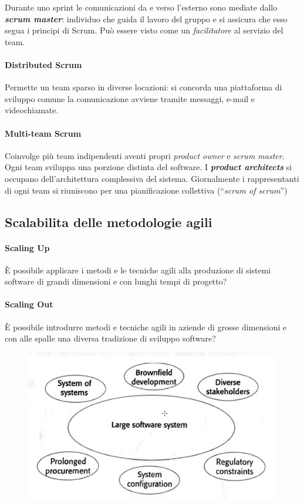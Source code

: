 Durante uno sprint le comunicazioni da e verso l'esterno sono mediate dallo \textbf{\textit{scrum master}}: individuo che guida il lavoro del gruppo e si assicura che esso segua i principi di Scrum. Può essere visto come un \textit{facilitatore} al servizio del team.

\paragraph{Distributed Scrum} Permette un team sparso in diverse locazioni: si concorda una piattaforma di sviluppo comune la comunicazione avviene tramite messaggi, e-mail e videochiamate.

\paragraph{Multi-team Scrum} Coinvolge più team indipendenti aventi propri \textit{product owner} e \textit{scrum master}. Ogni team sviluppa una porzione distinta del software. I \textbf{\textit{product architects}} si occupano dell'architettura complessiva del sistema. Giornalmente i rappresentanti di ogni team si riuniscono per una pianificazione collettiva (“\textit{scrum of scrum}”)

\subsection{Scalabilita delle metodologie agili}

\paragraph{Scaling Up} È possibile applicare i metodi e le tecniche agili alla produzione di sistemi software di grandi dimensioni e con lunghi tempi di progetto?

\paragraph{Scaling Out} È possibile introdurre metodi e tecniche agili in aziende di grosse dimensioni e con alle spalle una diversa tradizione di sviluppo software?

\begin{figure}[H]
    \centering
    \includegraphics[width=1\linewidth]{assets/large-software.png}
    \label{fig:large-software}
\end{figure}

